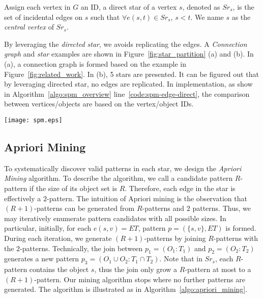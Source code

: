 \begin{definition}
Assign each vertex in $G$ an ID, a direct star of a vertex $s$, denoted as $Sr_s$, 
is the set of incidental edges on $s$
such that $\forall e(s,t) \in Sr_s$, $s < t$. We name $s$
as the \emph{central vertex} of $Sr_s$.
\end{definition}

By leveraging the \emph{directed star}, we avoids replicating the edges. 
A \emph{Connection graph} and \emph{star} examples are 
shown in Figure~\ref{fig:star_partition} (a) and (b). In (a), a connection graph is formed
based on the example in Figure~\ref{fig:related_work}.
In (b), 5 stars are presented. It can be figured out that by leveraging directed star, 
no edges are replicated. In implementation,
as show in Algorithm~\ref{algo:spm_overview} line~\ref{code:spm-edge-direct}, the
comparison between vertices/objects are based on the vertex/object IDs.

\begin{figure*}[t]
\centering
\texttt{[image: spm.eps]}
\caption{Star partition and mining. (a) Conceptual connection graph from Figure 1.(b) Five star partitions are generated
(c) Apriori Mining with various pruning techniques.}
\label{fig:star_partition}
\end{figure*}


\subsection{Apriori Mining}
To systematically discover valid patterns in each star, 
we design the \emph{Apriori Mining} algorithm. 
To describe the  algorithm, we call a candidate pattern $R$-pattern 
if the size of its object set is $R$.  Therefore, each edge
in the star is effectively a $2$-pattern. The intuition of Apriori mining
is the observation that $(R+1)$-patterns can be generated
from $R$-patterns and $2$ patterns. Thus, we may iteratively 
enumerate pattern candidates with all possible sizes.
In particular, initially, for each $e(s,v)=ET$, pattern $p=(\{s,v\}, ET)$ is formed. 
During each iteration, we generate $(R+1)$-patterns by joining $R$-patterns 
with the $2$-patterns. Technically, the join between $p_1=(O_1:T_1)$ and $p_2=(O_2:T_2)$
generates a new pattern $p_3=(O_1 \cup O_2:T_1 \cap T_2)$. Note that in $Sr_s$,
each $R$-pattern contains the object $s$, thus the join only 
grow a $R$-pattern at most to a $(R+1)$-pattern.
Our mining algorithm stops where no further patterns are generated. 
The algorithm is illustrated as in Algorithm~\ref{algo:apriori_mining}.

